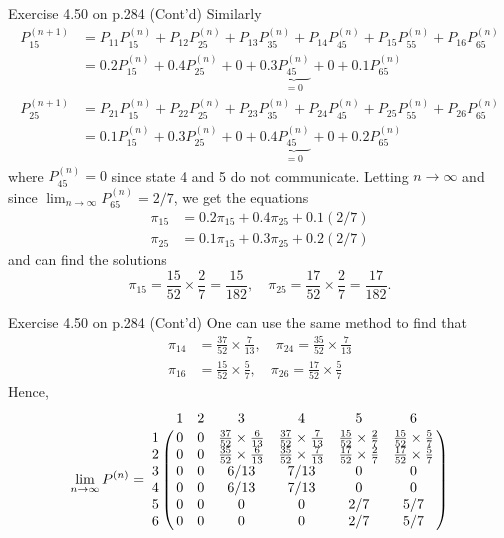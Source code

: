 \documentclass[letterpaper]{beamer}
\begin{document}
\begin{frame}{Exercise 4.50 on p.284 (Cont'd)}
Similarly
\begin{align*}
P^{(n+1)}_{15}&
=P_{11}P^{(n)}_{15}
+P_{12}P^{(n)}_{25}
+P_{13}P^{(n)}_{35}
+P_{14}P^{(n)}_{45}
+P_{15}P^{(n)}_{55}
+P_{16}P^{(n)}_{65}\\
&=0.2P^{(n)}_{15}+0.4P^{(n)}_{25}+0+0.3\underbrace{P^{(n)}_{45}}_{=0}+0+0.1P^{(n)}_{65}\\
P^{(n+1)}_{25}&
=P_{21}P^{(n)}_{15}
+P_{22}P^{(n)}_{25}
+P_{23}P^{(n)}_{35}
+P_{24}P^{(n)}_{45}
+P_{25}P^{(n)}_{55}
+P_{26}P^{(n)}_{65}\\
&=0.1P^{(n)}_{15}+0.3P^{(n)}_{25}+0+0.4\underbrace{P^{(n)}_{45}}_{=0}+0+0.2P^{(n)}_{65}
\end{align*}
where $P^{(n)}_{45}=0$ since state 4 and 5 do not communicate.
Letting $n\to \infty$ and since $\lim_{n\to\infty}P^{(n)}_{65}=2/7$,
we get the equations
\begin{align*}
\pi_{15}&=0.2\pi_{15}+0.4\pi_{25}+0.1(2/7)\\
\pi_{25}&=0.1\pi_{15}+0.3\pi_{25}+0.2(2/7)
\end{align*}
and can find the solutions
$$
\pi_{15}=\frac{15}{52}\times\frac{2}{7}=\frac{15}{182}, \quad\pi_{25}=\frac{17}{52}\times\frac{2}{7}=\frac{17}{182}.
$$
\end{frame}
\begin{frame}{Exercise 4.50 on p.284 (Cont'd)}
One can use the same method to find that
\begin{align*}
\pi_{14}&=\frac{37}{52}\times\frac{7}{13}, \quad\pi_{24}=\frac{35}{52}\times\frac{7}{13}\\
\pi_{16}&=\frac{15}{52}\times\frac{5}{7}, \quad\pi_{26}=\frac{17}{52}\times\frac{5}{7}
\end{align*}
Hence,
\[
\lim_{n\to\infty}P^{(n)}=
\bordermatrix{%
  &  1  &  2  &  3  &  4  &  5  &  6 \cr
1 & 0 & 0 &  \frac{37}{52}\times\frac{6}{13} & \frac{37}{52}\times\frac{7}{13}  &  \frac{15}{52}\times\frac{2}{7}  &  \frac{15}{52}\times\frac{5}{7} \cr
2 & 0 & 0 &  \frac{35}{52}\times\frac{6}{13} & \frac{35}{52}\times\frac{7}{13}  &  \frac{17}{52}\times\frac{2}{7}  &  \frac{17}{52}\times\frac{5}{7} \cr
3 & 0 & 0 & 6/13 & 7/13 & 0 & 0\cr
4 & 0 & 0 & 6/13 & 7/13 & 0 & 0\cr
5 & 0 & 0 & 0 & 0 & 2/7 & 5/7 \cr
6 & 0 & 0 & 0 & 0 & 2/7 & 5/7
}
\]

\end{frame}
\end{document}
